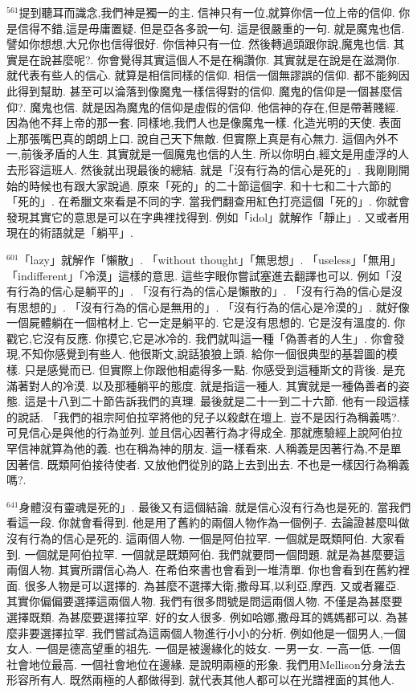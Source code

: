 \documentclass{book}
\begin{document}
$^{561}$提到聽耳而識念,我們神是獨一的主.
信神只有一位,就算你信一位上帝的信仰.
你是信得不錯,這是毋庸置疑.
但是亞各多說一句.
這是很嚴重的一句.
就是魔鬼也信.
譬如你想想,大兄你也信得很好.
你信神只有一位.
然後轉過頭跟你說,魔鬼也信.
其實是在說甚麼呢?.
你會覺得其實這個人不是在稱讚你.
其實就是在說是在滋潤你.
就代表有些人的信心.
就算是相信同樣的信仰.
相信一個無謬誤的信仰.
都不能夠因此得到幫助.
甚至可以淪落到像魔鬼一樣信得對的信仰.
魔鬼的信仰是一個甚麼信仰?.
魔鬼也信.
就是因為魔鬼的信仰是虛假的信仰.
他信神的存在,但是帶著賤經.
因為他不拜上帝的那一套.
同樣地,我們人也是像魔鬼一樣.
化造光明的天使.
表面上那張嘴巴真的朗朗上口.
說自己天下無敵.
但實際上真是有心無力.
這個內外不一,前後矛盾的人生.
其實就是一個魔鬼也信的人生.
所以你明白,經文是用虛浮的人去形容這班人.
然後就出現最後的總結.
就是「沒有行為的信心是死的」.
我剛剛開始的時候也有跟大家說過.
原來「死的」的二十節這個字.
和十七和二十六節的「死的」.
在希臘文來看是不同的字.
當我們翻查用紅色打亮這個「死的」.
你就會發現其實它的意思是可以在字典裡找得到.
例如「idol」就解作「靜止」.
又或者用現在的術語就是「躺平」.

$^{601}$「lazy」就解作「懶散」.
「without thought」「無思想」.
「useless」「無用」「indifferent」「冷漠」這樣的意思.
這些字眼你嘗試塞進去翻譯也可以.
例如「沒有行為的信心是躺平的」.
「沒有行為的信心是懶散的」.
「沒有行為的信心是沒有思想的」.
「沒有行為的信心是無用的」.
「沒有行為的信心是冷漠的」.
就好像一個屍體躺在一個棺材上.
它一定是躺平的.
它是沒有思想的.
它是沒有溫度的.
你戳它,它沒有反應.
你摸它,它是冰冷的.
我們就叫這一種「偽善者的人生」.
你會發現,不知你感覺到有些人.
他很斯文,說話狼狼上頭.
給你一個很典型的基碧圖的模樣.
只是感覺而已.
但實際上你跟他相處得多一點.
你感受到這種斯文的背後.
是充滿著對人的冷漠.
以及那種躺平的態度.
就是指這一種人.
其實就是一種偽善者的姿態.
這是十八到二十節告訴我們的真理.
最後就是二十一到二十六節.
他有一段這樣的說話.
「我們的祖宗阿伯拉罕將他的兒子以殺獻在壇上.
豈不是因行為稱義嗎?.
可見信心是與他的行為並列.
並且信心因著行為才得成全.
那就應驗經上說阿伯拉罕信神就算為他的義.
也在稱為神的朋友.
這一樣看來.
人稱義是因著行為,不是單因著信.
既類阿伯接待使者.
又放他們從別的路上去到出去.
不也是一樣因行為稱義嗎?.

$^{641}$身體沒有靈魂是死的」.
最後又有這個結論.
就是信心沒有行為也是死的.
當我們看這一段.
你就會看得到.
他是用了舊約的兩個人物作為一個例子.
去論證甚麼叫做沒有行為的信心是死的.
這兩個人物.
一個是阿伯拉罕.
一個就是既類阿伯.
大家看到.
一個就是阿伯拉罕.
一個就是既類阿伯.
我們就要問一個問題.
就是為甚麼要這兩個人物.
其實所謂信心為人.
在希伯來書也會看到一堆清單.
你也會看到在舊約裡面.
很多人物是可以選擇的.
為甚麼不選擇大衛,撒母耳,以利亞,摩西.
又或者羅亞.
其實你偏偏要選擇這兩個人物.
我們有很多問號是問這兩個人物.
不僅是為甚麼要選擇既類.
為甚麼要選擇拉罕.
好的女人很多.
例如哈娜,撒母耳的媽媽都可以.
為甚麼非要選擇拉罕.
我們嘗試為這兩個人物進行小小的分析.
例如他是一個男人,一個女人.
一個是德高望重的祖先.
一個是被邊緣化的妓女.
一男一女.
一高一低.
一個社會地位最高.
一個社會地位在邊緣.
是說明兩極的形象.
我們用Mellison分身法去形容所有人.
既然兩極的人都做得到.
就代表其他人都可以在光譜裡面的其他人.
\end{document}
